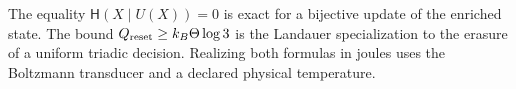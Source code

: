 \begin{statusbox}[title={Scope of the null Landauer relation}]
The equality \(\mathsf H(X\mid U(X))=0\) is exact for a bijective update of the enriched state. The bound \(Q_{\rm reset}\ge k_B\Theta\log3\) is the Landauer specialization to the erasure of a uniform triadic decision. Realizing both formulas in joules uses the Boltzmann transducer and a declared physical temperature.
\end{statusbox}
